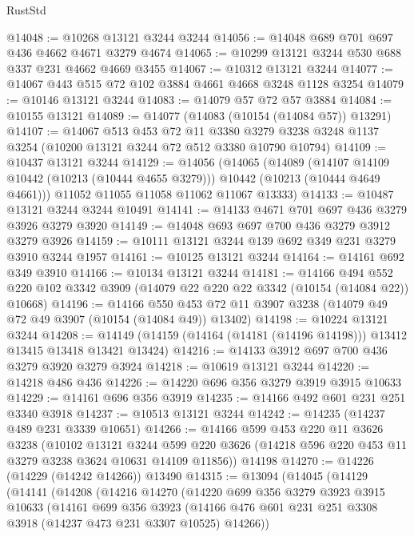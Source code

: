 \begin{lexlean}{RustStd}
\begin{coremodule}
@14048 := @10268 @13121 @3244 @3244
@14056 := @14048 @689 @701 @697 @436 @4662 @4671 @3279 @4674
@14065 := @10299 @13121 @3244 @530 @688 @337 @231 @4662 @4669 @3455
@14067 := @10312 @13121 @3244
@14077 := @14067 @443 @515 @72 @102 @3884 @4661 @4668 @3248 @1128 @3254
@14079 := @10146 @13121 @3244
@14083 := @14079 @57 @72 @57 @3884
@14084 := @10155 @13121
@14089 := @14077 (@14083 (@10154 (@14084 @57)) @13291)
@14107 := @14067
    @513
    @453
    @72
    @11
    @3380
    @3279
    @3238
    @3248
    @1137
    @3254
    (@10200 @13121 @3244 @72 @512 @3380 @10790 @10794)
@14109 := @10437 @13121 @3244
@14129 := @14056
    (@14065
      (@14089
        (@14107 @14109 @10442 (@10213 (@10444 @4655 @3279)))
        @10442
        (@10213 (@10444 @4649 @4661)))
      @11052
      @11055
      @11058
      @11062
      @11067
      @13333)
@14133 := @10487 @13121 @3244 @3244 @10491
@14141 := @14133 @4671 @701 @697 @436 @3279 @3926 @3279 @3920
@14149 := @14048 @693 @697 @700 @436 @3279 @3912 @3279 @3926
@14159 := @10111 @13121 @3244 @139 @692 @349 @231 @3279 @3910 @3244 @1957
@14161 := @10125 @13121 @3244
@14164 := @14161 @692 @349 @3910
@14166 := @10134 @13121 @3244
@14181 := @14166
    @494
    @552
    @220
    @102
    @3342
    @3909
    (@14079 @22 @220 @22 @3342 (@10154 (@14084 @22)) @10668)
@14196 := @14166
    @550
    @453
    @72
    @11
    @3907
    @3238
    (@14079 @49 @72 @49 @3907 (@10154 (@14084 @49)) @13402)
@14198 := @10224 @13121 @3244
@14208 := @14149 (@14159 (@14164 (@14181 (@14196 @14198))) @13412 @13415 @13418 @13421 @13424)
@14216 := @14133 @3912 @697 @700 @436 @3279 @3920 @3279 @3924
@14218 := @10619 @13121 @3244
@14220 := @14218 @486 @436
@14226 := @14220 @696 @356 @3279 @3919 @3915 @10633
@14229 := @14161 @696 @356 @3919
@14235 := @14166 @492 @601 @231 @251 @3340 @3918
@14237 := @10513 @13121 @3244
@14242 := @14235 (@14237 @489 @231 @3339 @10651)
@14266 := @14166
    @599
    @453
    @220
    @11
    @3626
    @3238
    (@10102
      @13121
      @3244
      @599
      @220
      @3626
      (@14218 @596 @220 @453 @11 @3279 @3238 @3624 @10631 @14109 @11856))
    @14198
@14270 := @14226 (@14229 (@14242 @14266)) @13490
@14315 := @13094
    (@14045
      (@14129
        (@14141
          (@14208
            (@14216
              @14270
              (@14220
                @699
                @356
                @3279
                @3923
                @3915
                @10633
                (@14161
                  @699
                  @356
                  @3923
                  (@14166 @476 @601 @231 @251 @3308 @3918 (@14237 @473 @231 @3307 @10525) @14266))

\end{coremodule}
\end{lexlean}
